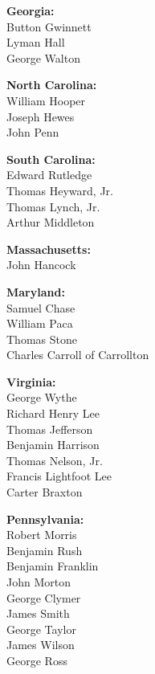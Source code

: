 \begin{multicols}{3}\raggedright

\begin{itemize}[wide,labelsep=*]

{\small
\item[] \textbf{Georgia:}\\
Button Gwinnett\\
Lyman Hall\\
George Walton


\item[] \textbf{North Carolina:}\\
William Hooper\\
Joseph Hewes\\
John Penn

\item[] \textbf{South Carolina:}\\
Edward Rutledge\\
Thomas Heyward, Jr.\\
Thomas Lynch, Jr.\\
Arthur Middleton


\item[] \textbf{Massachusetts:}\\
John Hancock

\item[] \textbf{Maryland:}\\
Samuel Chase\\
William Paca\\
Thomas Stone\\
Charles Carroll of Carrollton

\item[] \textbf{Virginia:}\\
George Wythe\\
Richard Henry Lee\\
Thomas Jefferson\\
Benjamin Harrison\\
Thomas Nelson, Jr.\\
Francis Lightfoot Lee\\
Carter Braxton


\item[] \textbf{Pennsylvania:}\\
Robert Morris\\
Benjamin Rush\\
Benjamin Franklin\\
John Morton\\
George Clymer\\
James Smith\\
George Taylor\\
James Wilson\\
George Ross

}
\end{itemize}
\end{multicols}
